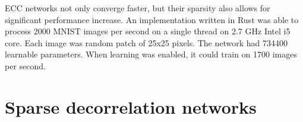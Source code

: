 \documentclass[12pt]{article}
\begin{document}
 \begin{table}[]
 	\label{table:ecc_accuracy_slow}
 	\caption{Each layer with even number uses slowness principle and its activations are randomly fixed. The odd layers do not fix their activations. The kernel size is 6x6 for odd and 1x1 for even layers. An interesting observation is that slowness allows for significant reduction in number of channels.}
 \end{table}

ECC networks not only converge faster, but their sparsity also allows for significant performance increase. An implementation written in Rust was able to process 2000 MNIST  images  per second on a single thread on 2.7 GHz Intel i5 core. Each image was random patch of 25x25 pixels. The network had 734400 learnable parameters. When learning was enabled, it could train on 1700 images per second. 

\section{Sparse decorrelation networks}
\end{document}
